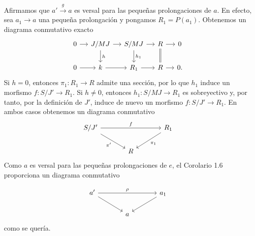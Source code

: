Afirmamos que $a'\xrightarrow g a$ es versal para las pequeñas
prolongaciones de $a$. En efecto, sea $a_1\longrightarrow a$ una
pequeña prolongación y pongamos $R_1=P(a_1)$. Obtenemos un diagrama
conmutativo exacto
\[
\begin{tikzcd}[column sep=small]
0 \arrow[r] & J/MJ \arrow[r] \arrow[d,"h"]
 & S/MJ \arrow[r] \arrow[d,"h_1"]
 & R \arrow[r] \arrow[d,equal] & 0 \\
0 \arrow[r] & k \arrow[r] & R_1 \arrow[r] & R \arrow[r] & 0.
\end{tikzcd}
\]
Si $h=0$, entonces $\pi_1:R_1\longrightarrow R$ admite una sección,
por lo que $h_1$ induce un morfismo $f:S/J'\longrightarrow R_1$. Si
$h\ne0$, entonces $h_1:S/MJ\longrightarrow R_1$ es sobreyectivo y,
por tanto, por la definición de $J'$, induce de nuevo un morfismo
$f:S/J'\longrightarrow R_1$. En ambos casos obtenemos un diagrama
conmutativo
\[
\begin{tikzcd}[column sep=large]
S/J' \sisi{\arrow[rr,"f",no head]}{\arrow[rr,"f"]} \arrow[dr,"\pi'"']
 & & R_1 \arrow[dl,"\pi_1"] \\
& R &
\end{tikzcd}
\]
Como $a$ es versal para las pequeñas prolongaciones de $e$, el
Corolario 1.6 proporciona un diagrama conmutativo


\[
\begin{tikzcd}[column sep=large]
a' \arrow[rr,"\rho"] \arrow[dr] & & a_1 \arrow[dl] \\
& a &
\end{tikzcd}
\]
como se quería.
